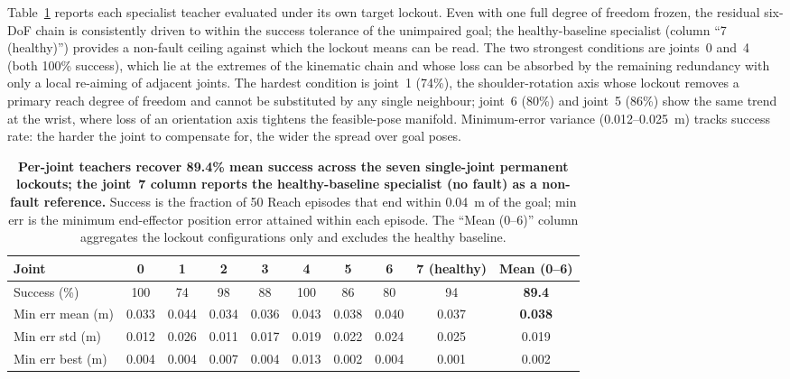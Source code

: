\documentclass{article}
\begin{document}
		Table~\ref{tab:teacher-per-joint} reports each specialist teacher evaluated under its own
		target lockout. Even with one full degree of freedom frozen, the residual six-DoF chain is
		consistently driven to within the success tolerance of the unimpaired goal; the
		healthy-baseline specialist (column ``7 (healthy)'') provides a non-fault ceiling against
		which the lockout means can be read. The two strongest
		conditions are joints~0 and~4 (both 100\% success), which lie at the
		extremes of the kinematic chain and whose loss can be absorbed by the
		remaining redundancy with only a local re-aiming of adjacent joints. The
		hardest condition is joint~1 (74\%), the shoulder-rotation axis whose
		lockout removes a primary reach degree of freedom and cannot be substituted
		by any single neighbour; joint~6 (80\%) and joint~5 (86\%) show the same
		trend at the wrist, where loss of an orientation axis tightens the
		feasible-pose manifold. Minimum-error variance (0.012--0.025~m) tracks
		success rate: the harder the joint to compensate for, the wider the spread
		over goal poses.

		\begin{table}[t]
		\centering
		\small
		\caption{\textbf{Per-joint teachers recover 89.4\% mean success across the seven
		single-joint permanent lockouts; the joint~7 column reports the healthy-baseline
		specialist (no fault) as a non-fault reference.} Success is the fraction of 50 Reach
		episodes that end within 0.04~m of the goal; min err is the minimum end-effector position
		error attained within each episode. The ``Mean (0--6)'' column aggregates the lockout
		configurations only and excludes the healthy baseline.}
		\label{tab:teacher-per-joint}
		\begin{tabular}{lcccccccc c}
		\toprule
		Joint & 0 & 1 & 2 & 3 & 4 & 5 & 6 & 7 (healthy) & Mean (0--6) \\
		\midrule
		Success (\%)            & 100  & 74   & 98   & 88   & 100  & 86   & 80   & 94   & \textbf{89.4} \\
		Min err mean (m)        & 0.033 & 0.044 & 0.034 & 0.036 & 0.043 & 0.038 & 0.040 & 0.037 & \textbf{0.038} \\
		Min err std (m)         & 0.012 & 0.026 & 0.011 & 0.017 & 0.019 & 0.022 & 0.024 & 0.025 & 0.019 \\
		Min err best (m)        & 0.004 & 0.004 & 0.007 & 0.004 & 0.013 & 0.002 & 0.004 & 0.001 & 0.002 \\
		\bottomrule
		\end{tabular}
		\end{table}
\end{document}
